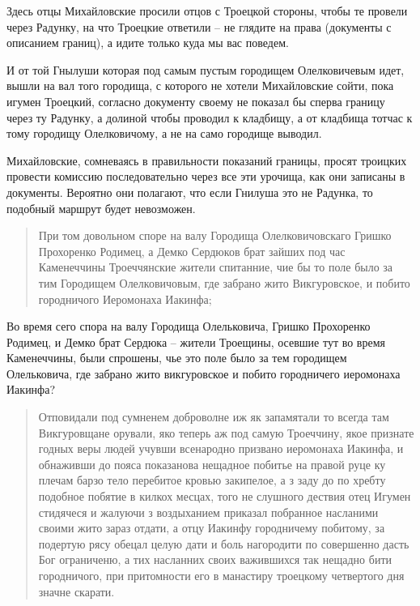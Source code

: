 Здесь отцы Михайловские просили отцов с Троецкой стороны, чтобы те провели через Радунку, на что Троецкие ответили – не глядите на права (документы с описанием границ), а идите только куда мы вас поведем.

И от той Гнылуши которая под самым пустым городищем Олелковичевым идет, вышли на вал того городища, с которого не хотели Михайловские сойти, пока игумен Троецкий, согласно документу своему не показал бы сперва границу через ту Радунку, а долиной чтобы проводил к кладбищу, а от кладбища тотчас к тому городищу Олелковичому, а не на само городище выводил.

Михайловские, сомневаясь в правильности показаний границы, просят троицких провести комиссию последовательно через все эти урочища, как они записаны в документы. Вероятно они полагают, что если Гнилуша это не Радунка, то подобный маршрут будет невозможен.

\begin{quotation}
При том довольном споре на валу Городища Олелковичовскаго Гришко Прохоренко Родимец, а Демко Сердюков брат зайших под час Каменеччины Троеччянские жители спитанние, чие бы то поле было за тим Городищем Олелковичовым, где забрано жито Викгуровское, и побито городничого Иеромонаха Иакинфа;
\end{quotation}

Во время сего спора на валу Городища Олельковича, Гришко Прохоренко Родимец, и Демко брат Сердюка – жители Троещины, осевшие тут во время Каменеччины, были спрошены, чье это поле было за тем городищем Олельковича, где забрано жито викгуровское и побито городничего иеромонаха Иакинфа?

\begin{quotation}
Отповидали под сумненем доброволне иж як запамятали то всегда там Викгуровщане орували, яко теперь аж под самую Троеччину, якое признате годных веры людей учувши всенародно призвано иеромонаха Иакинфа, и обнаживши до пояса показанова нещадное побитье на правой руце ку плечам барзо тело перебитое кровью закипелое, а з заду до по хребту подобное побятие в килкох месцах, того не слушного дествия отец Игумен стидячеся и жалуючи з воздыханием приказал побранное насланими своими жито зараз отдати, а отцу Иакинфу городничему побитому, за подертую рясу обецал целую дати и боль нагородити по совершенно дасть Бог ограниченю, а тих насланних своих важившихся так нещадно бити городничого, при притомности его в манастиру троецкому четвертого дня значне скарати.
\end{quotation}

